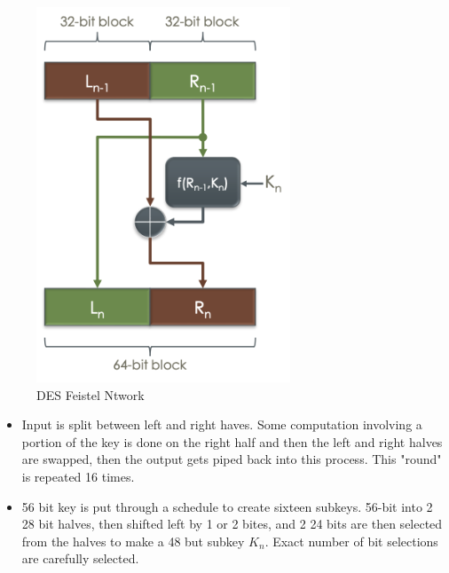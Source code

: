 \documentclass[../notes.tex]{subfiles}
\begin{document}
\begin{figure}[H]
    \centering
    \includegraphics[width=0.8\linewidth]{img/image_2023-02-10-00-07-50.png}
    \caption{DES Feistel Ntwork}
\end{figure}
\begin{itemize}
    \item Input is split between left and right haves. Some computation involving a portion of the key is done on the right half and then the left and right halves are swapped, then the output gets piped back into this process. This "round" is repeated 16 times.
    \item 56 bit key is put through a schedule to create sixteen subkeys. 56-bit into 2 28 bit halves, then shifted left by 1 or 2 bites, and 2 24 bits are then selected from the halves to make a 48 but subkey $ K_n $. Exact number of bit selections are carefully selected.
\end{itemize}
\end{document}
